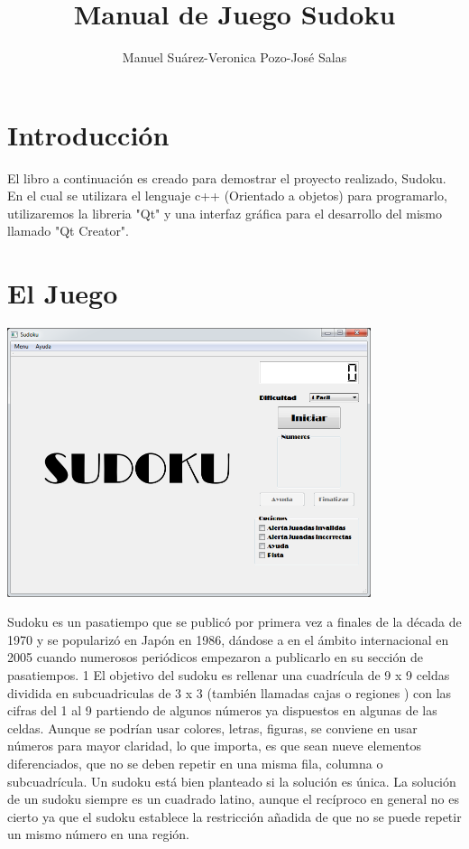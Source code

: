\documentclass[12pt,oneside]{book}
\title{Manual de Juego Sudoku}
\author{Manuel Suárez-Veronica Pozo-José Salas}
\begin{document}
\maketitle
\tableofcontents

\chapter{Introducción}

El libro a continuación es creado para demostrar el proyecto realizado, Sudoku. 
En el cual se utilizara el lenguaje c++ (Orientado a objetos) para programarlo, utilizaremos la libreria "Qt" y una interfaz gráfica para el desarrollo del mismo llamado
"Qt Creator". 

\chapter{El Juego}
\begin{center}
	\includegraphics[width=0.8\textwidth]{./imagenes/PantallaPrincipal.png}

	Sudoku es un pasatiempo que se publicó por primera vez a finales de la década de 1970 y se popularizó en Japón en 1986, dándose a 	en el ámbito internacional en 2005 cuando numerosos periódicos empezaron a publicarlo en su sección de pasatiempos. 1 El objetivo del sudoku es rellenar una cuadrícula de 9 x 9 celdas dividida en subcuadriculas de 3 x 3 (también llamadas  cajas o regiones ) con las cifras del 1 al 9 partiendo de algunos números ya dispuestos en algunas de las celdas. 
	Aunque se podrían usar colores, letras, figuras, se conviene en usar números para mayor claridad, lo que importa, es que sean nueve elementos diferenciados, que no se deben repetir en una misma fila,
	columna o subcuadrícula. Un sudoku está bien planteado si la solución es única. La solución de un sudoku siempre es un cuadrado latino, aunque el recíproco
	en general no es cierto ya que el sudoku establece la restricción añadida de que no se puede repetir un mismo número en una región.
\end{center}
\end{document}
